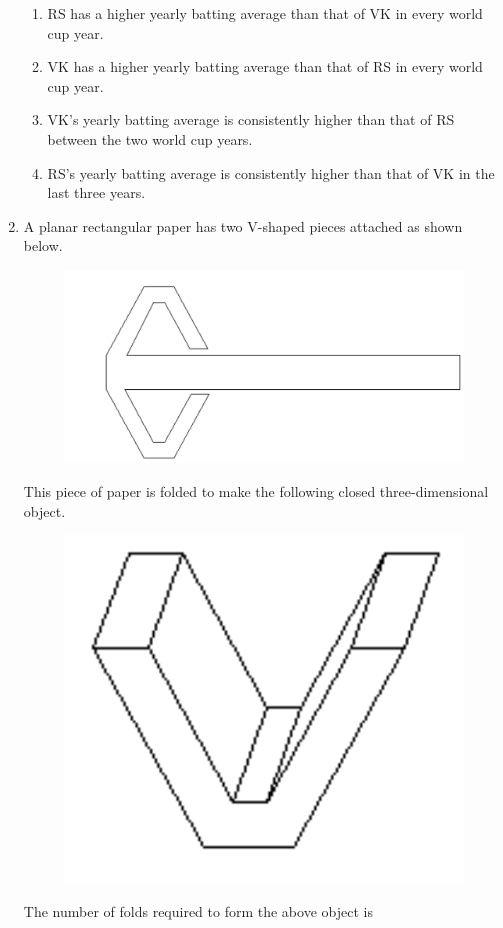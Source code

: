 \documentclass[journal,11pt,onecolumn]{IEEEtran}
\begin{document}
\begin{enumerate}[resume]
          \begin{enumerate}
              \item RS has a higher yearly batting average than that of VK in every world cup year.
              \item VK has a higher yearly batting average than that of RS in every world cup year.
              \item VK's yearly batting average is consistently higher than that of RS between the two world cup years.
              \item RS's yearly batting average is consistently higher than that of VK in the last three years.
          \end{enumerate}

    \item A planar rectangular paper has two V-shaped pieces attached as shown below.
          \begin{figure}[H]
              \centering
              \includegraphics[scale=0.2]{q9a}
              \caption{}
              \label{fig:q9a}
          \end{figure}
          This piece of paper is folded to make the following closed three-dimensional object.
          \begin{figure}[H]
              \centering
              \includegraphics[scale=0.2]{q9b}
              \caption{}
              \label{fig:q9}
          \end{figure}
          The number of folds required to form the above object is


\end{enumerate}
\end{document}
